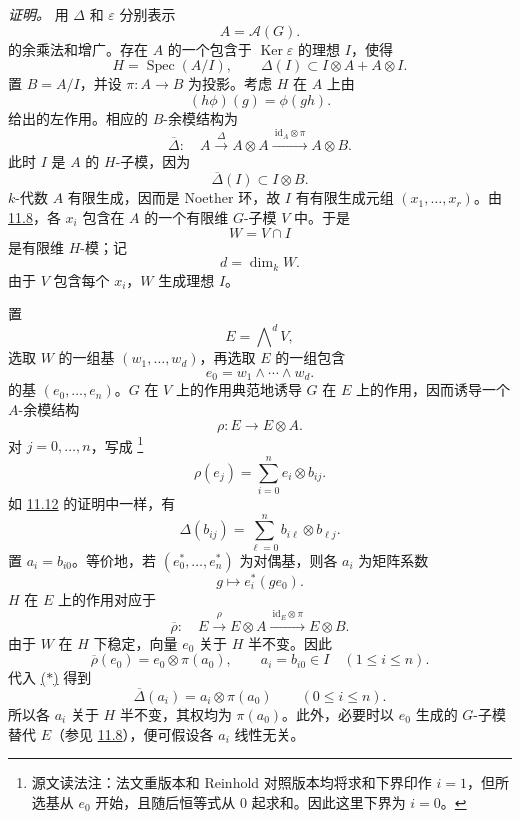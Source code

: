 \emph{证明。}
用 \(\Delta\) 和 \(\varepsilon\) 分别表示
\[
  A=\mathcal A(G).
\]
的余乘法和增广。存在 \(A\) 的一个包含于 \(\operatorname{Ker}\varepsilon\) 的理想 \(I\)，使得
\[
  H=\operatorname{Spec}(A/I),
  \qquad
  \Delta(I)\subset I\otimes A+A\otimes I.
\]
置 \(B=A/I\)，并设 \(\pi:A\to B\) 为投影。考虑 \(H\) 在 \(A\) 上由
\[
  (h\phi)(g)=\phi(gh).
\]
给出的左作用。相应的 \(B\)-余模结构为
\label{form:sga3-VIB-11.16-H-coaction-A}%
\[
  \overline{\Delta}:\quad
  A\xrightarrow{\ \Delta\ }A\otimes A
    \xrightarrow{\ \mathrm{id}_A\otimes\pi\ }A\otimes B.
\]
此时 \(I\) 是 \(A\) 的 \(H\)-子模，因为
\[
  \overline{\Delta}(I)\subset I\otimes B.
\]
\(k\)-代数 \(A\) 有限生成，因而是 Noether 环，故 \(I\) 有有限生成元组 \((x_1,\ldots,x_r)\)。由 \hyperref[lem:sga3-VIB-11.8]{11.8}，各 \(x_i\) 包含在 \(A\) 的一个有限维 \(G\)-子模 \(V\) 中。于是
\[
  W=V\cap I
\]
是有限维 \(H\)-模；记
\[
  d=\dim_kW.
\]
由于 \(V\) 包含每个 \(x_i\)，\(W\) 生成理想 \(I\)。

置
\[
  E=\bigwedge\nolimits^dV,
\]
选取 \(W\) 的一组基 \((w_1,\ldots,w_d)\)，再选取 \(E\) 的一组包含
\[
  e_0=w_1\wedge\cdots\wedge w_d.
\]
的基 \((e_0,\ldots,e_n)\)。\(G\) 在 \(V\) 上的作用典范地诱导 \(G\) 在 \(E\) 上的作用，因而诱导一个 \(A\)-余模结构
\[
  \rho:E\longrightarrow E\otimes A.
\]
对 \(j=0,\ldots,n\)，写成%
\begingroup
\renewcommand{\thefootnote}{\fnsymbol{footnote}}%
\footnote[2]{\label{note:sga3-VIB-11.16-rho-index-source-reading}
源文读法注：法文重版本和 Reinhold 对照版本均将求和下界印作 \(i=1\)，但所选基从 \(e_0\) 开始，且随后恒等式从 \(0\) 起求和。因此这里下界为 \(i=0\)。}
\endgroup
{}\label{form:sga3-VIB-11.16-rho-matrix}%
\[
  \rho(e_j)=\sum_{i=0}^{n}e_i\otimes b_{ij}.
\]
如 \hyperref[lem:sga3-VIB-11.12]{11.12} 的证明中一样，有
\label{form:sga3-VIB-11.16-star}%
\[
  \tag{\(*\)}
  \Delta(b_{ij})
    =\sum_{\ell=0}^{n}b_{i\ell}\otimes b_{\ell j}.
\]
置 \(a_i=b_{i0}\)。等价地，若 \((e_0^*,\ldots,e_n^*)\) 为对偶基，则各 \(a_i\) 为矩阵系数
\[
  g\longmapsto e_i^*(ge_0).
\]
\(H\) 在 \(E\) 上的作用对应于
\label{form:sga3-VIB-11.16-H-coaction-E}%
\[
  \overline{\rho}:\quad
  E\xrightarrow{\ \rho\ }E\otimes A
    \xrightarrow{\ \mathrm{id}_E\otimes\pi\ }E\otimes B.
\]
由于 \(W\) 在 \(H\) 下稳定，向量 \(e_0\) 关于 \(H\) 半不变。因此
\[
  \overline{\rho}(e_0)=e_0\otimes\pi(a_0),
  \qquad
  a_i=b_{i0}\in I\quad(1\leq i\leq n).
\]
代入 \hyperref[form:sga3-VIB-11.16-star]{\textup{(\(*\))}} 得到
\[
  \overline{\Delta}(a_i)
    =a_i\otimes\pi(a_0)
  \qquad(0\leq i\leq n).
\]
所以各 \(a_i\) 关于 \(H\) 半不变，其权均为 \(\pi(a_0)\)。此外，必要时以 \(e_0\) 生成的 \(G\)-子模替代 \(E\)\textup{（参见 \hyperref[lem:sga3-VIB-11.8]{11.8}）}，便可假设各 \(a_i\) 线性无关。

